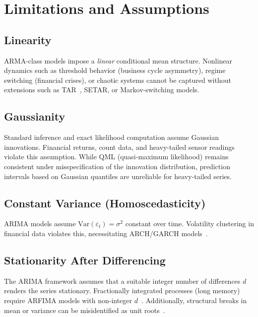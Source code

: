 \documentclass[conference]{IEEEtran}
\theoremstyle{definition}
\begin{document}
\section{Limitations and Assumptions}
\label{sec:limits}

\subsection{Linearity}

ARMA-class models impose a \emph{linear} conditional mean structure.
Nonlinear dynamics such as threshold behavior (business cycle asymmetry),
regime switching (financial crises), or chaotic systems cannot be captured
without extensions such as TAR~\cite{tong1990non},
SETAR, or Markov-switching models.

\subsection{Gaussianity}

Standard inference and exact likelihood computation assume Gaussian
innovations. Financial returns, count data, and heavy-tailed sensor readings
violate this assumption. While QML (quasi-maximum likelihood) remains
consistent under misspecification of the innovation distribution, prediction
intervals based on Gaussian quantiles are unreliable for heavy-tailed series.

\subsection{Constant Variance (Homoscedasticity)}

ARIMA models assume $\mathrm{Var}(\varepsilon_t) = \sigma^2$ constant over
time. Volatility clustering in financial data violates this, necessitating
ARCH/GARCH models~\cite{engle1982autoregressive,bollerslev1986generalized}.

\subsection{Stationarity After Differencing}

The ARIMA framework assumes that a suitable integer number of differences $d$
renders the series stationary. Fractionally integrated processes (long memory)
require ARFIMA models with non-integer $d$~\cite{granger1980introduction}.
Additionally, structural breaks in mean or variance can be misidentified as
unit roots~\cite{perron1989great}.
\end{document}
